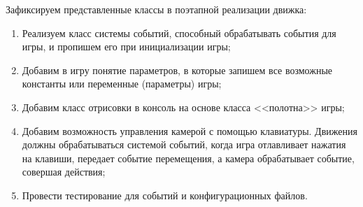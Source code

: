 	Зафиксируем представленные классы в поэтапной реализации движка:
	\begin{enumerate}
		\item Реализуем класс системы событий, способный обрабатывать события для игры, и пропишем его при инициализации игры;
		\item Добавим в игру понятие параметров, в которые запишем все возможные константы или переменные (параметры) игры;
		\item Добавим класс отрисовки в консоль на основе класса <<полотна>> игры;
		\item Добавим возможность управления камерой с помощью клавиатуры. Движения должны обрабатываться системой событий, когда игра отлавливает нажатия на клавиши, передает событие перемещения, а камера обрабатывает событие, совершая действия;
		\item Провести тестирование для событий и конфигурационных файлов.
	\end{enumerate}